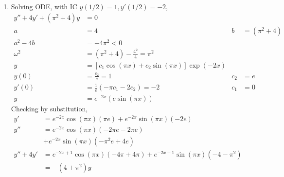 \begin{enumerate}
    \item Solving ODE, with IC $ y(1/2) = 1, y'(1/2) = -2 $,
          \begin{align}
              y'' + 4y' + (\pi^{2} + 4)y & = 0                                                                         \\
              a                          & = 4                                               & b     & = (\pi^{2} + 4) \\
              a^{2} - 4b                 & = -4\pi ^{2} < 0                                                            \\
              \omega^{2}                 & = (\pi ^{2} + 4) - \frac{4^{2}}{4} = \pi ^{2}                               \\
              y                          & = [c_{1}\cos(\pi x) + c_{2}\sin(\pi x)] \exp(-2x)                           \\
              y(0)                       & = \frac{c_{2}}{e} = 1                             & c_{2} & = e             \\
              y'(0)                      & = \frac{1}{e} (-\pi c_{1} - 2 c_{2}) = -2         & c_{1} & = 0             \\
              y                          & = e^{-2x}\left( e\sin(\pi x) \right)
          \end{align}
          Checking by substitution,
          \begin{align}
              y'        & = e^{-2x}\cos(\pi x) (\pi e) + e^{-2x}\sin(\pi x)(-2e)                   \\
              y''       & = e^{-2x}\cos(\pi x)(-2\pi e -2\pi e)                                    \\
                        & + e^{-2x}\sin(\pi x)(-\pi ^{2}e + 4e)                                    \\
              y'' + 4y' & = e^{-2x+1}\cos(\pi x)(-4\pi + 4\pi) + e^{-2x+1}\sin(\pi x)(-4-\pi ^{2}) \\
                        & = -(4 + \pi ^{2})y
          \end{align}


\end{enumerate}
